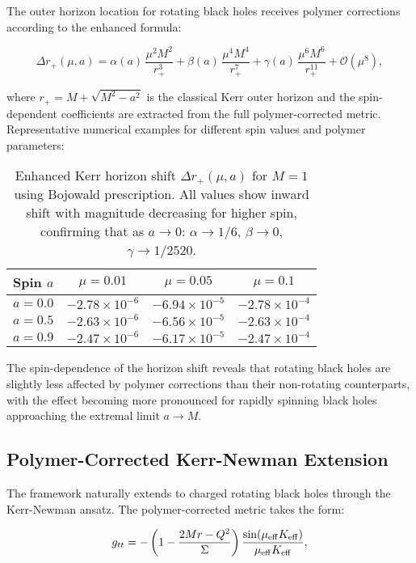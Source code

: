 \documentclass[11pt]{article}
\begin{document}
The outer horizon location for rotating black holes receives polymer corrections according to the enhanced formula:

\begin{equation}
\Delta r_+(\mu,a) = \alpha(a)\,\frac{\mu^2M^2}{r_+^3} + \beta(a)\,\frac{\mu^4M^4}{r_+^7} + \gamma(a)\,\frac{\mu^6M^6}{r_+^{11}} + \mathcal{O}(\mu^8),
\end{equation}

where $r_+ = M + \sqrt{M^2 - a^2}$ is the classical Kerr outer horizon and the spin-dependent coefficients are extracted from the full polymer-corrected metric. Representative numerical examples for different spin values and polymer parameters:

\begin{table}[h]
\centering
\begin{tabular}{|c|c|c|c|}
\hline
\textbf{Spin $a$} & \textbf{$\mu=0.01$} & \textbf{$\mu=0.05$} & \textbf{$\mu=0.1$} \\
\hline
$a=0.0$ & $-2.78 \times 10^{-6}$ & $-6.94 \times 10^{-5}$ & $-2.78 \times 10^{-4}$ \\
$a=0.5$ & $-2.63 \times 10^{-6}$ & $-6.56 \times 10^{-5}$ & $-2.63 \times 10^{-4}$ \\
$a=0.9$ & $-2.47 \times 10^{-6}$ & $-6.17 \times 10^{-5}$ & $-2.47 \times 10^{-4}$ \\
\hline
\end{tabular}
\caption{Enhanced Kerr horizon shift $\Delta r_+(\mu,a)$ for $M=1$ using Bojowald prescription. All values show inward shift with magnitude decreasing for higher spin, confirming that as $a \to 0$: $\alpha \to 1/6$, $\beta \to 0$, $\gamma \to 1/2520$.}
\end{table}

The spin-dependence of the horizon shift reveals that rotating black holes are slightly less affected by polymer corrections than their non-rotating counterparts, with the effect becoming more pronounced for rapidly spinning black holes approaching the extremal limit $a \to M$.

\subsection{Polymer-Corrected Kerr-Newman Extension}

The framework naturally extends to charged rotating black holes through the Kerr-Newman ansatz. The polymer-corrected metric takes the form:

\begin{equation}
g_{tt} = -\left(1 - \frac{2Mr - Q^2}{\Sigma}\right)\frac{\sin(\mu_{\rm eff}K_{\rm eff})}{\mu_{\rm eff}K_{\rm eff}},
\end{equation}
\end{document}
